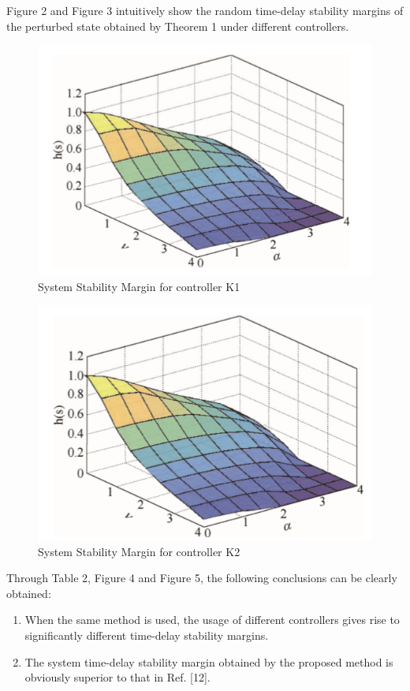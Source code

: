 \documentclass[journal]{IEEEtran}
\begin{document}
Figure 2 and Figure 3 intuitively show the random time-delay stability margins of the perturbed state obtained by Theorem 1 under different controllers. 
\begin{figure}[h!]
\includegraphics[width=\linewidth]{stabilitymarginfig1.png}
  \caption{System Stability Margin for controller K1}
  \label{Figure 2: System Stability margin for controller K1}
\end{figure}
\begin{figure}[h!]
\includegraphics[width=\linewidth]{stabilitymarginfig2.png}
  \caption{System Stability Margin for controller K2}
  \label{Figure 3: System Stability margin for controller K2}
\end{figure}
Through Table 2, Figure 4 and Figure 5, the following conclusions can be clearly obtained:
\begin{enumerate} 
  \item When the same method is used, the usage of different controllers gives rise to significantly different time-delay stability margins. 
  \item The system time-delay stability margin obtained by the proposed method is obviously superior to that in Ref. [12]. 
 \end{enumerate}
\end{document}
